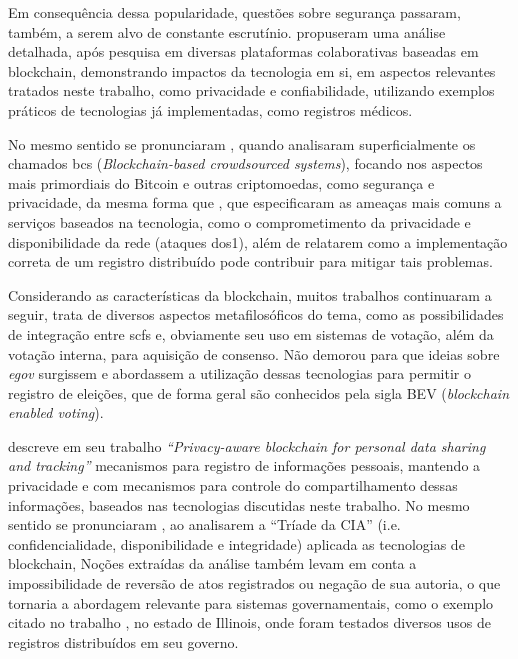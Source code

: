 Em consequência dessa popularidade, questões sobre segurança passaram, também, a serem alvo de constante escrutínio.  propuseram uma análise detalhada, após pesquisa em diversas plataformas colaborativas baseadas em blockchain, demonstrando impactos da tecnologia em si, em aspectos relevantes tratados neste trabalho, como privacidade e confiabilidade, utilizando exemplos práticos de tecnologias já implementadas, como registros médicos.  

No mesmo sentido se pronunciaram , quando analisaram superficialmente os chamados \gls{bcs} (\textit{Blockchain-based crowdsourced systems}), focando nos aspectos mais primordiais do Bitcoin e outras \glspl{criptomoeda}, como segurança e privacidade, da mesma forma que , que especificaram as ameaças mais comuns a serviços baseados na tecnologia, como o comprometimento da privacidade e  disponibilidade da rede (ataques \gls{dos1}), além de relatarem como a implementação correta de um registro distribuído pode contribuir para mitigar tais problemas. 

Considerando as características da blockchain, muitos trabalhos continuaram a seguir,  trata de diversos aspectos metafilosóficos do tema, como as possibilidades de integração entre \glspl{scf} e, obviamente seu uso em sistemas de votação, além da votação interna, para aquisição de consenso. Não demorou para que ideias sobre \textit{\gls{egov}} surgissem e abordassem a utilização dessas tecnologias para permitir o registro de eleições, que de forma geral são conhecidos pela sigla BEV (\textit{blockchain enabled voting}).

 descreve em seu trabalho \textit{“Privacy-aware blockchain for personal data sharing and tracking”} mecanismos para registro de informações pessoais, mantendo a privacidade e com mecanismos para controle do compartilhamento dessas informações, baseados nas tecnologias discutidas neste trabalho. No mesmo sentido se pronunciaram , ao analisarem a “Tríade da CIA” (i.e. confidencialidade, disponibilidade e integridade) aplicada as tecnologias de blockchain, Noções extraídas da análise também levam em conta a impossibilidade de reversão de atos registrados ou negação de sua autoria, o que tornaria a abordagem relevante para sistemas governamentais, como o exemplo citado no trabalho \cite{Warkentin2020}, no estado de Illinois, onde foram testados diversos usos de registros distribuídos em seu governo. 

